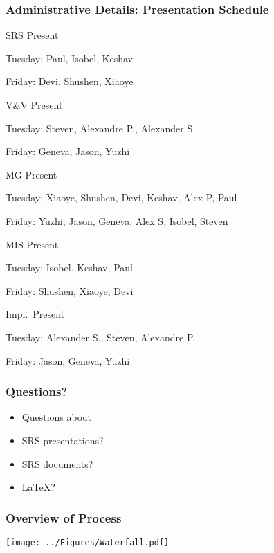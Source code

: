 \documentclass[t,12pt,numbers,fleqn]{beamer}
\begin{document}

\begin{frame}
\frametitle{Administrative Details: Presentation Schedule}

\bi
\item{SRS Present}
\bi
\item Tuesday: Paul, Isobel, Keshav
\item Friday: Devi, Shushen, Xiaoye
\ei
\item V\&V Present
\bi
\item Tuesday: Steven, Alexandre P., Alexander S.
\item Friday: Geneva, Jason, Yuzhi
\ei
\item MG Present
\bi
\item Tuesday: Xiaoye, Shushen, Devi, Keshav, Alex P, Paul
\item Friday: Yuzhi, Jason, Geneva, Alex S, Isobel, Steven
\ei
\item MIS Present
\bi
\item Tuesday: Isobel, Keshav, Paul
\item Friday: Shushen, Xiaoye, Devi
\ei
\item Impl.\ Present
\bi
\item Tuesday: Alexander S., Steven, Alexandre P.
\item Friday: Jason, Geneva, Yuzhi
\ei

\ei

\end{frame}


\begin{frame}
\frametitle{Questions?}
\begin{itemize}
\item Questions about
\bi
\item SRS presentations?
\item SRS documents?
\item LaTeX?
\ei
\end{itemize}
\end{frame}


\begin{frame}
\frametitle{Overview of Process}

\begin{center}
 \texttt{[image: ../Figures/Waterfall.pdf]}
\end{center}

\end{frame}
\end{document}
